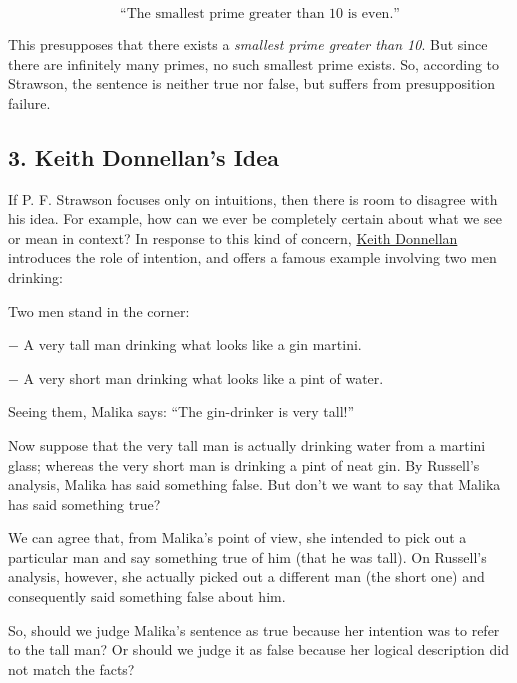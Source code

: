 \[\text{“The smallest prime greater than 10 is even.”}\]

This presupposes that there exists a \emph{smallest prime greater than
10}. But since there are infinitely many primes, no such smallest prime
exists. So, according to Strawson, the sentence is neither true nor
false, but suffers from presupposition failure.

\subsection{3. Keith Donnellan's Idea}\label{keith-donnellans-idea}

If P. F. Strawson focuses only on intuitions, then there is room to
disagree with his idea. For example, how can we ever be completely
certain about what we see or mean in context? In response to this kind
of concern, \href{https://en.wikipedia.org/wiki/Keith_Donnellan}{Keith
Donnellan} introduces the role of intention, and offers a famous example
involving two men drinking:

Two men stand in the corner:

− A very tall man drinking what looks like a gin martini.

− A very short man drinking what looks like a pint of water.

Seeing them, Malika says: ``The gin-drinker is very tall!''

Now suppose that the very tall man is actually drinking water from a
martini glass; whereas the very short man is drinking a pint of neat
gin. By Russell's analysis, Malika has said something false. But don't
we want to say that Malika has said something true?

We can agree that, from Malika's point of view, she intended to pick out
a particular man and say something true of him (that he was tall). On
Russell's analysis, however, she actually picked out a different man
(the short one) and consequently said something false about him.

So, should we judge Malika's sentence as true because her intention was
to refer to the tall man? Or should we judge it as false because her
logical description did not match the facts?
